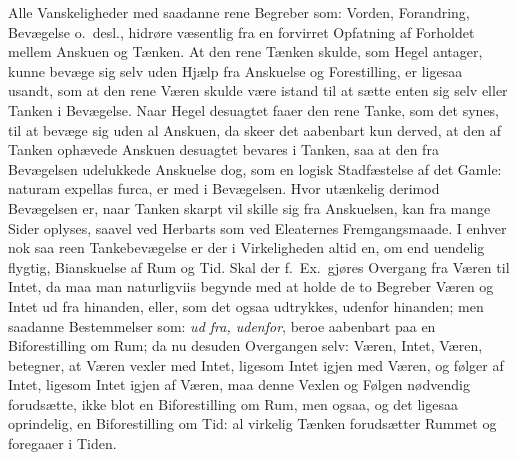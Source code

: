 \documentclass[12pt]{book}
\newcommand{\opage}[1]{\marginnote{\footnotesize\textit{[#1]}}}
\begin{document}
Alle Vanskeligheder med saadanne rene Begreber som: Vorden, Forandring, Bevægelse o.\
desl., hidrøre væsentlig fra en forvirret Opfatning af Forholdet mellem Anskuen og
Tænken. At den rene Tænken skulde, som Hegel antager, kunne bevæge sig selv uden
Hjælp fra Anskuelse og Forestilling, er ligesaa usandt, som at den rene Væren skulde
være istand til at sætte enten sig selv eller Tanken i Bevægelse. Naar Hegel
desuagtet faaer den rene Tanke, som det synes, til at bevæge sig uden al Anskuen, da
skeer det aabenbart kun derved, at den af Tanken ophævede Anskuen desuagtet bevares i
Tanken, saa at den fra Bevægelsen udelukkede Anskuelse dog, som en logisk Stadfæstelse
af det Gamle: naturam expellas furca, er med i Bevægelsen. Hvor utænkelig derimod
Bevægelsen er, naar Tanken skarpt vil skille sig fra Anskuelsen, kan fra mange Sider
oplyses, saavel ved Herbarts som ved Eleaternes Fremgangsmaade. I enhver nok saa reen
Tankebevægelse er der i Virkeligheden altid en, om end uendelig flygtig, Bianskuelse
af Rum og Tid. Skal der
\opage{19} f.\ Ex.\ gjøres Overgang fra Væren til Intet, da maa man naturligviis begynde med at
holde de to Begreber Væren og Intet ud fra hinanden, eller, som det ogsaa udtrykkes,
udenfor hinanden; men saadanne Bestemmelser som: \emph{ud fra, udenfor}, beroe
aabenbart paa en Biforestilling om Rum; da nu desuden Overgangen selv: Væren, Intet,
Væren, betegner, at Væren vexler med Intet, ligesom Intet igjen med Væren, og følger
af Intet, ligesom Intet igjen af Væren, maa denne Vexlen og Følgen nødvendig
forudsætte, ikke blot en Biforestilling om Rum, men ogsaa, og det ligesaa oprindelig,
en Biforestilling om Tid: al virkelig Tænken forudsætter Rummet og foregaaer i Tiden.
\end{document}
